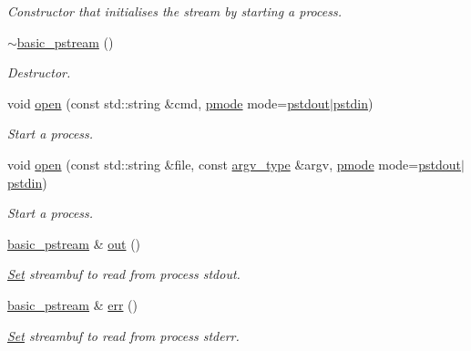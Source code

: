 \begin{DoxyCompactItemize}
\begin{DoxyCompactList}\small\item\em Constructor that initialises the stream by starting a process. \end{DoxyCompactList}\item 
\mbox{\hyperlink{classredi_1_1basic__pstream_a331fbc7e238df3a47736499c6c48380c}{$\sim$basic\+\_\+pstream}} ()
\begin{DoxyCompactList}\small\item\em Destructor. \end{DoxyCompactList}\item 
void \mbox{\hyperlink{classredi_1_1basic__pstream_a110210bdb99afe12493e172b9017560c}{open}} (const std\+::string \&cmd, \mbox{\hyperlink{structredi_1_1pstreams_a1eae4aad88812af03a0fbb3ec13c50b7}{pmode}} mode=\mbox{\hyperlink{structredi_1_1pstreams_ad3c6d53a98de4566478b1c40c101a42b}{pstdout}}$\vert$\mbox{\hyperlink{structredi_1_1pstreams_a7a976ce992db857f86a0cc3352e42d3a}{pstdin}})
\begin{DoxyCompactList}\small\item\em Start a process. \end{DoxyCompactList}\item 
void \mbox{\hyperlink{classredi_1_1basic__pstream_a4f2e9ab168a74b8ea9a8546870085e4b}{open}} (const std\+::string \&file, const \mbox{\hyperlink{structredi_1_1pstreams_af902b894b095c1875e96c10129489467}{argv\+\_\+type}} \&argv, \mbox{\hyperlink{structredi_1_1pstreams_a1eae4aad88812af03a0fbb3ec13c50b7}{pmode}} mode=\mbox{\hyperlink{structredi_1_1pstreams_ad3c6d53a98de4566478b1c40c101a42b}{pstdout}}$\vert$\mbox{\hyperlink{structredi_1_1pstreams_a7a976ce992db857f86a0cc3352e42d3a}{pstdin}})
\begin{DoxyCompactList}\small\item\em Start a process. \end{DoxyCompactList}\item 
\mbox{\hyperlink{classredi_1_1basic__pstream}{basic\+\_\+pstream}} \& \mbox{\hyperlink{classredi_1_1basic__pstream_ad9137d50003e6182cbc4fc25ee093bed}{out}} ()
\begin{DoxyCompactList}\small\item\em \mbox{\hyperlink{classSet}{Set}} streambuf to read from process\textquotesingle{} {\ttfamily stdout}. \end{DoxyCompactList}\item 
\mbox{\hyperlink{classredi_1_1basic__pstream}{basic\+\_\+pstream}} \& \mbox{\hyperlink{classredi_1_1basic__pstream_a63a8021d6fe3ca821f2f78520c194e3c}{err}} ()
\begin{DoxyCompactList}\small\item\em \mbox{\hyperlink{classSet}{Set}} streambuf to read from process\textquotesingle{} {\ttfamily stderr}. \end{DoxyCompactList}\end{DoxyCompactItemize}
